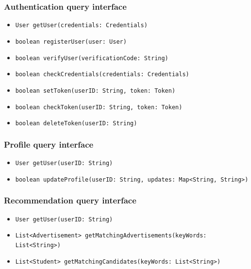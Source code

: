 \subsubsection{Authentication query interface}
\begin{itemize}
    \item \verb|User getUser(credentials: Credentials)|
    \item \verb|boolean registerUser(user: User)|
    \item \verb|boolean verifyUser(verificationCode: String)|
    \item \verb|boolean checkCredentials(credentials: Credentials)|
    \item \verb|boolean setToken(userID: String, token: Token)|
    \item \verb|boolean checkToken(userID: String, token: Token)|
    \item \verb|boolean deleteToken(userID: String)|
\end{itemize}

\subsubsection{Profile query interface}
\begin{itemize}
    \item \verb|User getUser(userID: String)|
    \item \verb|boolean updateProfile(userID: String, updates: Map<String, String>)|
\end{itemize}

\subsubsection{Recommendation query interface}
\begin{itemize}
    \item \verb|User getUser(userID: String)|
    \item \verb|List<Advertisement> getMatchingAdvertisements(keyWords: List<String>)|
    \item \verb|List<Student> getMatchingCandidates(keyWords: List<String>)|
\end{itemize}

